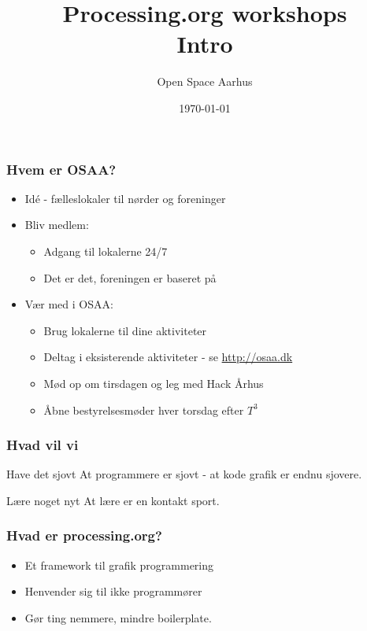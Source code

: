 \documentclass{beamer}
\title{Processing.org workshops\\Intro}
\author{Open Space Aarhus}
\date{\today}
\institute[Bryggervej 30]{Bryggervej 30, 8240 Århus N}
\begin{document}
\begin{frame}[label=titlepage]
  \titlepage
\end{frame}

\begin{frame}
  \frametitle{Hvem er OSAA?}
  \begin{itemize}
  \item Idé - fælleslokaler til nørder og foreninger
  \item Bliv medlem:
    \begin{itemize}
    \item Adgang til lokalerne 24/7
    \item Det er det, foreningen er baseret på
    \end{itemize}

  \item Vær med i OSAA:
    \begin{itemize}
    \item Brug lokalerne til dine aktiviteter
    \item Deltag i eksisterende aktiviteter - se \url{http://osaa.dk}
    \item Mød op om tirsdagen og leg med Hack Århus
    \item Åbne bestyrelsesmøder hver torsdag efter ${T^3}$
    \end{itemize}
  \end{itemize}						
\end{frame}

\begin{frame}
  \frametitle{Hvad vil vi}
  
  \begin{block}{Have det sjovt}
    At programmere er sjovt - at kode grafik er endnu sjovere.
  \end{block}

  \begin{block}{Lære noget nyt}
    At lære er en kontakt sport.
  \end{block}
  
\end{frame}


\begin{frame}
  \frametitle{Hvad er processing.org?}
  \begin{itemize}
  \item   Et framework til grafik programmering
  \item   Henvender sig til ikke programmører
  \item   Gør ting nemmere, mindre boilerplate.
  \end{itemize}
\end{frame}
\end{document}
